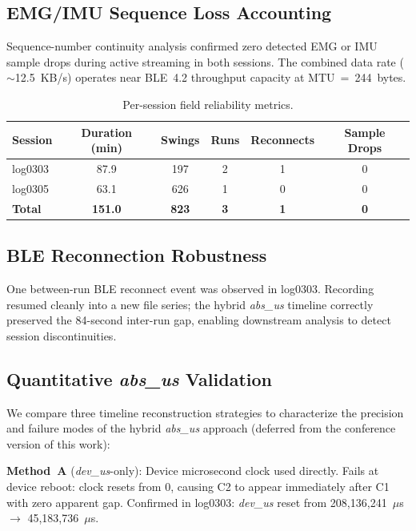 \documentclass[sensors,article,submit,pdftex,moreauthors]{Definitions/mdpi}
\begin{document}
\subsection{EMG/IMU Sequence Loss Accounting}

Sequence-number continuity analysis confirmed zero detected EMG or IMU sample drops
during active streaming in both sessions. The combined data rate ($\sim$12.5~KB/s)
operates near BLE~4.2 throughput capacity at MTU~=~244~bytes.

\begin{table}[H]
\caption{Per-session field reliability metrics.\label{tab:sessions}}
\begin{tabularx}{\textwidth}{XCCCCC}
\toprule
\textbf{Session} & \textbf{Duration (min)} & \textbf{Swings} & \textbf{Runs} & \textbf{Reconnects} & \textbf{Sample Drops} \\
\midrule
log0303 & 87.9 & 197 & 2 & 1 & 0 \\
log0305 & 63.1 & 626 & 1 & 0 & 0 \\
\midrule
\textbf{Total} & \textbf{151.0} & \textbf{823} & \textbf{3} & \textbf{1} & \textbf{0} \\
\bottomrule
\end{tabularx}
\end{table}

\subsection{BLE Reconnection Robustness}

One between-run BLE reconnect event was observed in log0303. Recording resumed cleanly
into a new file series; the hybrid \textit{abs\_us} timeline correctly preserved the
84-second inter-run gap, enabling downstream analysis to detect session discontinuities.

\subsection{Quantitative \textit{abs\_us} Validation}
\label{sec:absus_val}

We compare three timeline reconstruction strategies to characterize the precision and
failure modes of the hybrid \textit{abs\_us} approach (deferred from the conference
version of this work):

\textbf{Method~A} (\textit{dev\_us}-only): Device microsecond clock used directly.
Fails at device reboot: clock resets from 0, causing C2 to appear immediately after C1
with zero apparent gap. Confirmed in log0303: \textit{dev\_us} reset from
208{,}136{,}241~$\mu$s $\rightarrow$ 45{,}183{,}736~$\mu$s.
\end{document}
